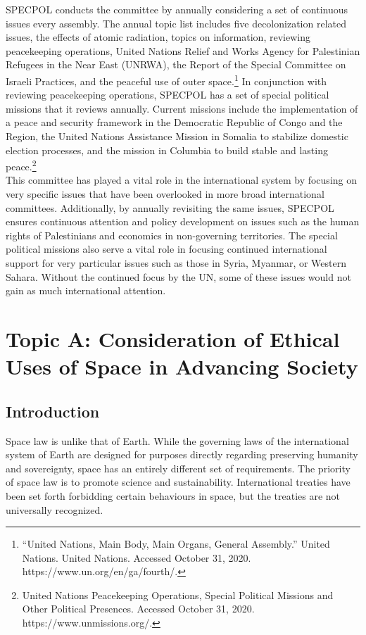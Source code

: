 \documentclass[10pt, letterpaper]{article}
\begin{document}
SPECPOL conducts the committee by annually considering a set of
continuous issues every assembly. The annual topic list includes five
decolonization related issues, the effects of atomic radiation, topics
on information, reviewing peacekeeping operations, United Nations Relief
and Works Agency for Palestinian Refugees in the Near East (UNRWA), the
Report of the Special Committee on Israeli Practices, and the peaceful
use of outer space.\footnote{``United Nations, Main Body, Main Organs,
  General Assembly.'' United Nations. United Nations. Accessed October
  31, 2020. https://www.un.org/en/ga/fourth/.} In conjunction with
reviewing peacekeeping operations, SPECPOL has a set of special
political missions that it reviews annually. Current missions include
the implementation of a peace and security framework in the Democratic
Republic of Congo and the Region, the United Nations Assistance Mission
in Somalia to stabilize domestic election processes, and the mission in
Columbia to build stable and lasting peace.\footnote{United Nations
  Peacekeeping Operations, Special Political Missions and Other
  Political Presences. Accessed October 31, 2020.
  https://www.unmissions.org/.}\\
  
This committee has played a vital role in the international system by
focusing on very specific issues that have been overlooked in more broad
international committees. Additionally, by annually revisiting the same
issues, SPECPOL ensures continuous attention and policy development on
issues such as the human rights of Palestinians and economics in
non-governing territories. The special political missions also serve a
vital role in focusing continued international support for very
particular issues such as those in Syria, Myanmar, or Western Sahara.
Without the continued focus by the UN, some of these issues would not
gain as much international attention.

\newpage
\section{Topic A: Consideration of Ethical Uses of Space in Advancing Society}

\subsection{Introduction}

Space law is unlike that of Earth. While the governing laws of the
international system of Earth are designed for purposes directly
regarding preserving humanity and sovereignty, space has an entirely
different set of requirements. The priority of space law is to promote
science and sustainability. International treaties have been set forth
forbidding certain behaviours in space, but the treaties are not
universally recognized. \\
\end{document}
